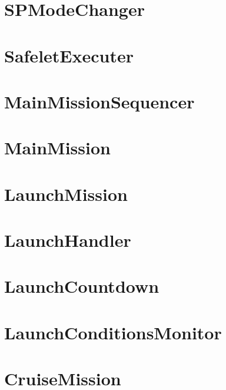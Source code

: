 \documentclass[10pt,a4paper,final]{article}
\begin{document}
\section{SPModeChanger}

\pagebreak

\section{SafeletExecuter}

\pagebreak

\section{MainMissionSequencer}

\pagebreak

\section{MainMission}

\pagebreak


\section{LaunchMission}

\pagebreak

\section{LaunchHandler}

\pagebreak

\section{LaunchCountdown}

\pagebreak

\section{LaunchConditionsMonitor}

\pagebreak

\section{CruiseMission}

\pagebreak
\end{document}
